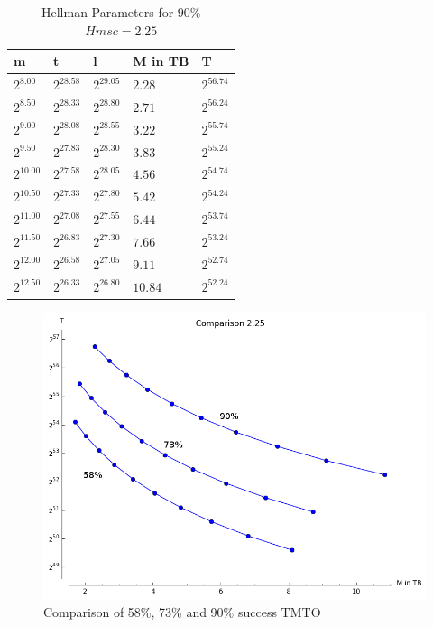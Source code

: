 \begin{table}[H]
  \centering
\begin{tabular}{lllll}
m & t & l & M in TB & T \\\hline
$2^{8.00}$ & $2^{28.58}$ & $2^{29.05}$ & $2.28$ & $2^{56.74}$ \\
$2^{8.50}$ & $2^{28.33}$ & $2^{28.80}$ & $2.71$ & $2^{56.24}$ \\
$2^{9.00}$ & $2^{28.08}$ & $2^{28.55}$ & $3.22$ & $2^{55.74}$ \\
$2^{9.50}$ & $2^{27.83}$ & $2^{28.30}$ & $3.83$ & $2^{55.24}$ \\
$2^{10.00}$ & $2^{27.58}$ & $2^{28.05}$ & $4.56$ & $2^{54.74}$ \\
$2^{10.50}$ & $2^{27.33}$ & $2^{27.80}$ & $5.42$ & $2^{54.24}$ \\
$2^{11.00}$ & $2^{27.08}$ & $2^{27.55}$ & $6.44$ & $2^{53.74}$ \\
$2^{11.50}$ & $2^{26.83}$ & $2^{27.30}$ & $7.66$ & $2^{53.24}$ \\
$2^{12.00}$ & $2^{26.58}$ & $2^{27.05}$ & $9.11$ & $2^{52.74}$ \\
$2^{12.50}$ & $2^{26.33}$ & $2^{26.80}$ & $10.84$ & $2^{52.24}$ \\
\end{tabular}
  \caption{Hellman Parameters for $90\%$ $Hmsc = 2.25$}
\end{table}

\begin{figure}[H]
  \centering
  \includegraphics[scale=0.4]{figures/compareHmsc2.25.png}
  \caption{Comparison of 58\%, 73\% and 90\% success TMTO}
  \label{fig:comparisonhell2.25}
\end{figure}

